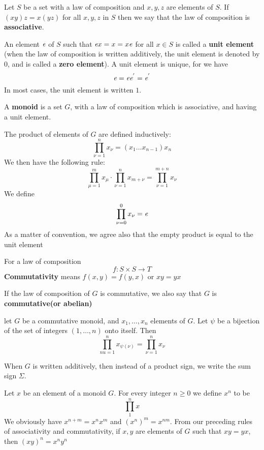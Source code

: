 \documentclass[a4paper, 11pt]{article}
\begin{document}
\begin{CJK}{UTF8}{gbsn}
Let $S$ be a set with a law of composition and $x, y, z$ are elements of $S$. If $(xy)z = x(yz)$ for all $x, y, z$ in $S$ then we say that the law of composition is
\textbf{associative}.\par

An element $\emph{e}$ of $S$ such that $\emph{e}x = x = x\emph{e}$ for all $x \in S$ is called a \textbf{unit element}
(when the law of composition is written additively, the unit element is denoted by $0$, and is called a \textbf{zero element}).
A unit element is unique, for we have
\[\emph{e} = \emph{e}\emph{e}^{'} = \emph{e}^{'}\] 
In most cases, the unit element is written $1$.\par

A \textbf{monoid} is a set $G$, with a law of composition which is associative, and having a unit element.\par

The product of elements of $G$ are defined inductively:
\[\prod_{\nu = 1}^{n}x_{\nu} = (x_{1} \dots x_{n - 1})x_{n}\]
We then have the following rule:
\[\prod_{\mu = 1}^{m}x_{\mu} \cdot \prod_{\nu = 1}^{n}x_{m + \nu} = \prod_{\nu = 1}^{m + n}x_{\nu}\]
We define
\[\prod_{\nu = 0}^{0}x_{\nu} = \emph{e}\]
As a matter of convention, we agree also that the empty product is equal to the unit element\par

For a law of composition
\[f: S \times S \longrightarrow T\]
\textbf{Commutativity} means $f(x, y) = f(y, x)$ or $xy = yx$\par

If the law of composition of $G$ is commutative, we also say that $G$ is \textbf{commutative(or abelian)}\par

let $G$ be a commutative monoid, and $x_{1}, \dots, x_{n}$ elements of $G$. Let $\psi$ be a bijection of the set of integers $(1, \dots, n)$
onto itself. Then
\[\prod_{nu = 1}^{n}x_{\psi(\nu)} = \prod_{\nu = 1}^{n}x_{\nu}\]

When $G$ is written additively, then instead of a product sign, we write the sum sign $\Sigma$.\par

Let $x$ be an element of a monoid $G$. For every integer $n \geq 0$ we define $x^{n}$ to be 
\[\prod_{1}^{n}x\]
We obviously have $x^{n + m} = x^{n}x^{m}$ and $(x^{n})^{m} = x^{nm}$. From our preceding rules of associativity and commutativity, if $x, y$ are elements 
of $G$ such that $xy = yx$, then $(xy)^{n} = x^{n}y^{n}$\par


\end{CJK}
\end{document}
